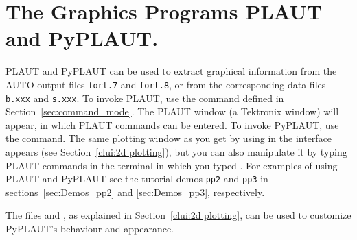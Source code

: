 \documentclass[12pt]{report}
\begin{document}
\chapter{ The Graphics Programs PLAUT and PyPLAUT.} \label{ch:PLAUT}
{\cal PLAUT} and {\cal PyPLAUT} can be used to extract graphical
information from the {\cal AUTO} output-files {\tt fort.7} and {\tt fort.8},
or from the corresponding data-files {\tt b.xxx} and {\tt s.xxx}.
To invoke {\cal PLAUT}, use the  command defined in 
Section~\ref{sec:command_mode}.
The {\cal PLAUT} window (a Tektronix window) will appear, in which {\cal PLAUT}
commands can be entered.
To invoke {\cal PyPLAUT}, use the  command. The same
plotting window as you get by using  in the \python interface
appears (see Section~\ref{clui:2d plotting}), 
but you can also manipulate it by typing {\cal PLAUT}
commands in the terminal in which you typed .
For examples of using {\cal PLAUT} and {\cal PyPLAUT} see the tutorial demos {\tt pp2}
and {\tt pp3} in sections~\ref{sec:Demos_pp2} and \ref{sec:Demos_pp3},
respectively.

The files  and , as explained in
Section~\ref{clui:2d plotting}, can be used to customize
{\cal PyPLAUT}'s behaviour and appearance.
\end{document}

